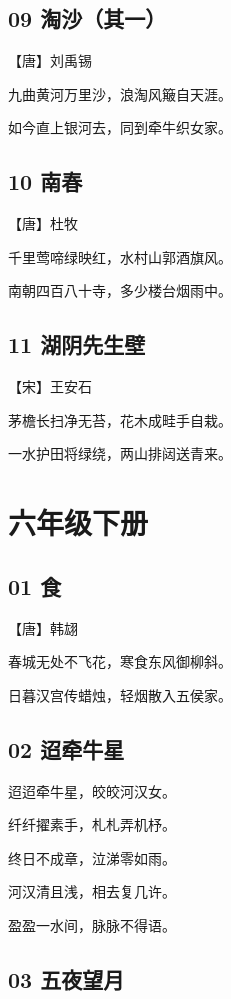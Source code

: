 \documentclass[a6paper, 12pt]{article}
\begin{document}
\subsection*{09 淘沙（其一）}

【唐】刘禹锡

九曲黄河万里沙，浪淘风簸自天涯。

如今直上银河去，同到牵牛织女家。

\subsection*{10 南春}

【唐】杜牧

千里莺啼绿映红，水村山郭酒旗风。

南朝四百八十寺，多少楼台烟雨中。

\subsection*{11 湖阴先生壁}

【宋】王安石

茅檐长扫净无苔，花木成畦手自栽。

一水护田将绿绕，两山排闼送青来。

\newpage

\section*{六年级下册}

\subsection*{01 食}

【唐】韩翃

春城无处不飞花，寒食东风御柳斜。

日暮汉宫传蜡烛，轻烟散入五侯家。

\subsection*{02 迢牵牛星}

迢迢牵牛星，皎皎河汉女。

纤纤擢素手，札札弄机杼。

终日不成章，泣涕零如雨。

河汉清且浅，相去复几许。

盈盈一水间，脉脉不得语。

\subsection*{03 五夜望月}
\end{document}
